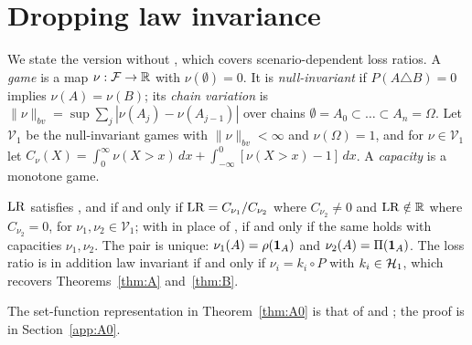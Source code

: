 \section{Dropping law invariance}\label{supp:A0}

We state the version without \axLI, which covers scenario-dependent loss ratios. A \emph{game} is a map $\nu:\mathcal F\to\mathbb R$ with $\nu(\emptyset)=0$. It is
\emph{null-invariant} if $P(A\triangle B)=0$ implies $\nu(A)=\nu(B)$; its \emph{chain variation} is
$\|\nu\|_{bv}=\sup\sum_j|\nu(A_j)-\nu(A_{j-1})|$ over chains
$\emptyset=A_0\subset\dots\subset A_n=\Omega$. Let $\mathcal V_1$ be the null-invariant games with
$\|\nu\|_{bv}<\infty$ and $\nu(\Omega)=1$, and for $\nu\in\mathcal V_1$ let
$C_\nu(X)=\int_0^\infty\nu(X>x)\,dx+\int_{-\infty}^0[\nu(X>x)-1]\,dx$. A \emph{capacity} is a monotone game.

\begin{theorem}\label{thm:A0}
$\mathrm{LR}$ satisfies \axPe, \axR{} and \axRC{} if and only if $\mathrm{LR}=C_{\nu_1}/C_{\nu_2}$ where
$C_{\nu_2}\ne0$ and $\mathrm{LR}\notin\mathbb R$ where $C_{\nu_2}=0$, for $\nu_1,\nu_2\in\mathcal V_1$; with \axRM{} in place
of \axRC{}, if and only if the same holds with capacities $\nu_1,\nu_2$. The pair is unique:
$\nu_1(A)=\rho(\mathbf 1_A)$ and $\nu_2(A)=\Pi(\mathbf 1_A)$. The loss ratio is in addition law invariant if and only if
$\nu_i=k_i\circ P$ with $k_i\in\mathcal H_1$, which recovers Theorems~\ref{thm:A} and~\ref{thm:B}.
\end{theorem}

The set-function representation in Theorem~\ref{thm:A0} is that of \citet{msm1994} and
\citet{cmmm2012,cmmm2015}; the proof is in Section~\ref{app:A0}.